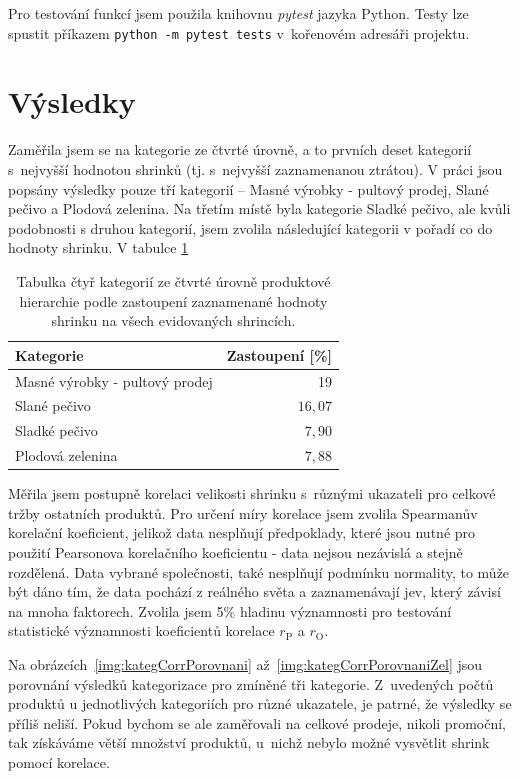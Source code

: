 Pro testování funkcí jsem použila knihovnu \emph{pytest} jazyka Python. Testy lze spustit příkazem \texttt{python -m pytest tests} v~kořenovém adresáři projektu.


\section{Výsledky}

Zaměřila jsem se na kategorie ze čtvrté úrovně, a to prvních deset kategorií s~nejvyšší hodnotou shrinků (tj. s~nejvyšší zaznamenanou ztrátou). V práci jsou popsány výsledky pouze tří kategorií -- Masné výrobky - pultový prodej, Slané pečivo a Plodová zelenina. Na třetím místě byla kategorie Sladké pečivo, ale kvůli podobnosti s druhou kategorií, jsem zvolila následující kategorii v pořadí co do hodnoty shrinku.
V tabulce \ref*{tab:lostcost4}

\begin{table}[hbtp!]
    \centering
    \captionsetup{justification=centering}
    \caption{Tabulka čtyř kategorií ze čtvrté úrovně produktové hierarchie podle zastoupení zaznamenané hodnoty shrinku na všech evidovaných shrincích.}
    \begin{tabular}{l r}
        Kategorie & Zastoupení [\%] \\

    \hline
    Masné výrobky - pultový prodej & 19 \\
    Slané pečivo&  $16{,}07$\\
    Sladké pečivo&   $7{,}90$\\
    Plodová zelenina&   $7{,}88$\\
    \end{tabular}
    \label{tab:lostcost4}
    \end{table}

 Měřila jsem postupně korelaci velikosti shrinku s~různými ukazateli pro celkové tržby ostatních produktů. Pro určení míry korelace jsem zvolila Spearmanův korelační koeficient, jelikož data nesplňují předpoklady, které jsou nutné pro použití Pearsonova korelačního koeficientu - data nejsou nezávislá a stejně rozdělená. Data vybrané společnosti, také nesplňují podmínku normality, to může být dáno tím, že data pochází z reálného světa a zaznamenávají jev, který závisí na mnoha faktorech. Zvolila jsem 5\% hladinu významnosti pro testování statistické významnosti koeficientů korelace $r_\mathrm{P}$ a $r_\mathrm{O}$.

Na obrázcích~\ref*{img:kategCorrPorovnani} až~\ref*{img:kategCorrPorovnaniZel} jsou porovnání výsledků kategorizace pro zmíněné tři kategorie. 
Z~uvedených počtů produktů u jednotlivých kategoriích pro různé ukazatele, je patrné, že výsledky se příliš neliší. Pokud bychom se ale zaměřovali na celkové prodeje, nikoli promoční, tak získáváme větší množství produktů, u~nichž nebylo možné vysvětlit shrink pomocí korelace. 

